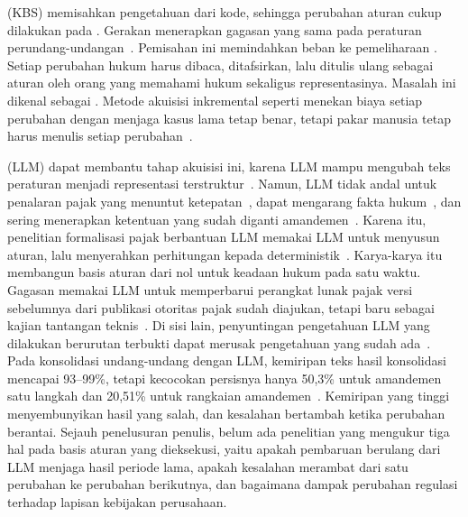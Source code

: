  (KBS) memisahkan pengetahuan dari kode, sehingga perubahan aturan cukup dilakukan pada . Gerakan  menerapkan gagasan yang sama pada peraturan perundang-undangan~\cite{merigoux2021catala,mowbray2023scaling,kowalski2022logicalenglish}. Pemisahan ini memindahkan beban ke pemeliharaan . Setiap perubahan hukum harus dibaca, ditafsirkan, lalu ditulis ulang sebagai aturan oleh orang yang memahami hukum sekaligus representasinya. Masalah ini dikenal sebagai . Metode akuisisi inkremental seperti  menekan biaya setiap perubahan dengan menjaga kasus lama tetap benar, tetapi pakar manusia tetap harus menulis setiap perubahan~\cite{compton1990philosophical,compton2021rippledown}.

 (LLM) dapat membantu tahap akuisisi ini, karena LLM mampu mengubah teks peraturan menjadi representasi terstruktur~\cite{janatian2023texttostructure}. Namun, LLM tidak andal untuk penalaran pajak yang menuntut ketepatan~\cite{blairstanek2023gpt3,nay2024taxattorneys}, dapat mengarang fakta hukum~\cite{dahl2024legalfictions,magesh2025hallucination}, dan sering menerapkan ketentuan yang sudah diganti amandemen~\cite{prior2026asking,huang2026wrong}. Karena itu, penelitian formalisasi pajak berbantuan LLM memakai LLM untuk menyusun aturan, lalu menyerahkan perhitungan kepada  deterministik~\cite{veeramani2026neurosymbolic,yadamsuren2026formalization,lorenzo2025translating,han2026autoformalization,jurayj2026tax}. Karya-karya itu membangun basis aturan dari nol untuk keadaan hukum pada satu waktu. Gagasan memakai LLM untuk memperbarui perangkat lunak pajak versi sebelumnya dari publikasi otoritas pajak sudah diajukan, tetapi baru sebagai kajian tantangan teknis~\cite{goganikhiabani2025maintaining}. Di sisi lain, penyuntingan pengetahuan LLM yang dilakukan berurutan terbukti dapat merusak pengetahuan yang sudah ada~\cite{gupta2024forgetting,gu2024harms}. Pada konsolidasi undang-undang dengan LLM, kemiripan teks hasil konsolidasi mencapai 93--99\%, tetapi kecocokan persisnya hanya 50,3\% untuk amandemen satu langkah dan 20,51\% untuk rangkaian amandemen~\cite{prior2025risks}. Kemiripan yang tinggi menyembunyikan hasil yang salah, dan kesalahan bertambah ketika perubahan berantai. Sejauh penelusuran penulis, belum ada penelitian yang mengukur tiga hal pada basis aturan yang dieksekusi, yaitu apakah pembaruan berulang dari LLM menjaga hasil periode lama, apakah kesalahan merambat dari satu perubahan ke perubahan berikutnya, dan bagaimana dampak perubahan regulasi terhadap lapisan kebijakan perusahaan.

